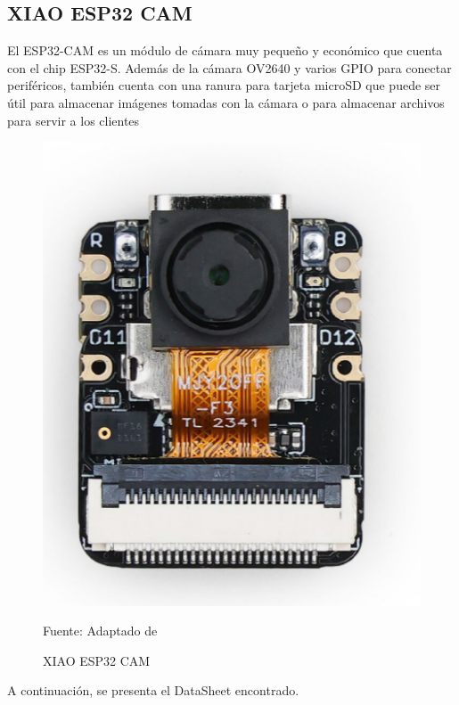 \subsection{XIAO ESP32 CAM}
El ESP32-CAM es un módulo de cámara muy pequeño y económico que cuenta con el chip ESP32-S. Además de la cámara OV2640 y varios GPIO para conectar periféricos, también cuenta con una ranura para tarjeta microSD que puede ser útil para almacenar imágenes tomadas con la cámara o para almacenar archivos para servir a los clientes 

\begin{figure}[htb]
	\centering
	\includegraphics[scale  = 0.70]{Imagenes/xiao.png}
	\caption{XIAO ESP32 CAM}{Fuente: Adaptado de~\cite{foto_xiao}}
\end{figure}

A continuación, se presenta el DataSheet encontrado.

